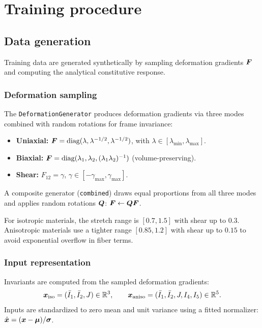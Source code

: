 \section{Training procedure}
\label{sec:training}

\subsection{Data generation}
\label{sec:training:data}

Training data are generated synthetically by sampling deformation gradients
$\bm{F}$ and computing the analytical constitutive response.

\subsubsection{Deformation sampling}

The \texttt{DeformationGenerator} produces deformation gradients via three
modes combined with random rotations for frame invariance:
\begin{itemize}
  \item \textbf{Uniaxial:} $\bm{F} = \text{diag}(\lambda, \lambda^{-1/2},
    \lambda^{-1/2})$, with $\lambda \in [\lambda_\min, \lambda_\max]$.
  \item \textbf{Biaxial:} $\bm{F} = \text{diag}(\lambda_1, \lambda_2,
    (\lambda_1\lambda_2)^{-1})$ (volume-preserving).
  \item \textbf{Shear:} $F_{12} = \gamma$, $\gamma \in [-\gamma_\max,
    \gamma_\max]$.
\end{itemize}
A composite generator (\texttt{combined}) draws equal proportions from all
three modes and applies random rotations $\bm{Q}$:
$\bm{F} \leftarrow \bm{Q}\bm{F}$.

For isotropic materials, the stretch range is $[0.7, 1.5]$ with shear up to
$0.3$.  Anisotropic materials use a tighter range $[0.85, 1.2]$ with shear up
to $0.15$ to avoid exponential overflow in fiber terms.

\subsubsection{Input representation}

Invariants are computed from the sampled deformation gradients:
\begin{equation}
  \bm{x}_\text{iso} = (\bar{I}_1, \bar{I}_2, J) \in \mathbb{R}^3, \qquad
  \bm{x}_\text{aniso} = (\bar{I}_1, \bar{I}_2, J, I_4, I_5) \in \mathbb{R}^5.
  \label{eq:input_repr}
\end{equation}
Inputs are standardized to zero mean and unit variance using a fitted
normalizer: $\hat{\bm{x}} = (\bm{x} - \bm{\mu}) / \bm{\sigma}$.


